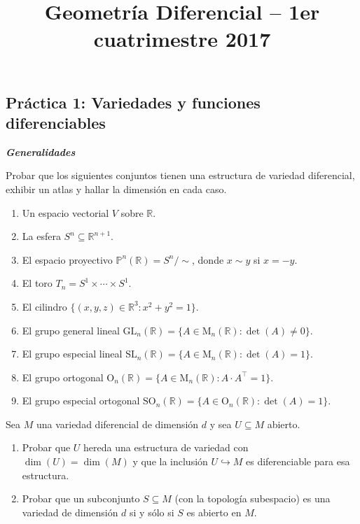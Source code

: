 \documentclass[12pt, a4paper]{amsart}
\theoremstyle{definition}
\newcommand{\RR}{\mathbb{R}}      %
\begin{document}
\title{Geometría Diferencial -- 1er cuatrimestre 2017}
\author{}
\date{}
\nocite{*}
\maketitle
\begin{center}
\section*{Práctica 1: Variedades y funciones diferenciables}
\end{center}

\textsl{\textbf{Generalidades}}
\vspace{1em}


\begin{question}
Probar que los siguientes conjuntos tienen una estructura de variedad diferencial, exhibir un atlas y hallar la dimensión en cada caso.
\begin{enumerate}[label=\textbf{\alph*.}]
\item Un espacio vectorial $V$ sobre $\RR$.
\item La esfera $S^n\subseteq\RR^{n+1}$.
\item El espacio proyectivo $\mathbb{P}^n(\RR) = S^n / \sim$, donde $x\sim y$ si $x=- y$.
\item El toro $T_n = S^1\times\cdots\times S^1$.
\item El cilindro $\{(x,y,z)\in\RR^3:x^2+y^2=1\}$.
\item El grupo general lineal $\mathrm{GL}_n(\RR)=\{A\in\mathrm{M}_n(\RR):\det(A)\neq 0\}$.
\item El grupo especial lineal $\mathrm{SL}_n(\RR)=\{A\in\mathrm{M}_n(\RR):\det(A)=1\}$.
\item El grupo ortogonal $\mathrm{O}_n(\RR) = \{A\in\mathrm{M}_n(\RR):A\cdot A^\intercal=1\}$.
\item El grupo especial ortogonal $\mathrm{SO}_n(\RR)=\{A\in\mathrm{O}_n(\RR) : \det(A)=1\}$.
\end{enumerate}
\end{question}

\begin{question}
Sea $M$ una variedad diferencial de dimensión $d$ y sea $U\subseteq M$ abierto. 
\begin{enumerate}[label=\textbf{\alph*.}]
\item Probar que $U$ hereda una estructura de variedad con $\dim(U)=\dim(M)$ y que la inclusión $U\hookrightarrow M$ es diferenciable para esa estructura.
\item Probar que un subconjunto $S\subseteq M$ (con la topología subespacio) es una variedad de dimensión $d$ si y sólo si $S$ es abierto en $M$.
\end{enumerate}
\end{question}
\end{document}

